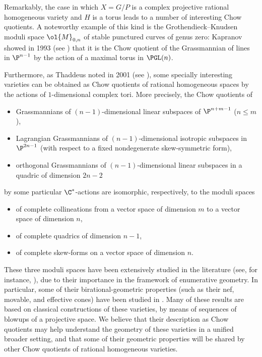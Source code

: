 \documentclass[11pt]{amsart}
\numberwithin{equation}{section}
\theoremstyle{definition}
\theoremstyle{remark}
\begin{document}
Remarkably, the case in which $X=G/P$ is a complex projective rational homogeneous variety and $H$ is a torus leads to a number of interesting Chow quotients. A noteworthy example of this kind is the Grothendieck--Knudsen moduli space $\ol{M}_{0,n}$ of stable punctured curves of genus zero: Kapranov showed in 1993 (see \cite[Chapter~4]{Kap}) that it is the Chow quotient of the Grassmannian of lines in $\P^{n-1}$ by the action of a maximal torus in $\PGL(n)$. 

Furthermore, as Thaddeus noted in 2001 (see \cite{Thaddeus}), some specially interesting varieties can be obtained as Chow quotients of  rational homogeneous spaces by the actions of $1$-dimensional complex tori. More precisely, the Chow quotients of
\begin{itemize}[leftmargin=25pt]
\item Grassmannians of $(n-1)$-dimensional linear subspaces of $\P^{n+m-1}$ ($n \le m$),
\item Lagrangian Grassmannians of $(n-1)$-dimensional isotropic subspaces in $\P^{2n-1}$ (with respect to a fixed nondegenerate skew-symmetric form),
\item orthogonal Grassmannians of $(n-1)$-dimensional linear subspaces in a quadric of dimension $2n-2$ 
\end{itemize}
by some particular $\C^*$-actions are isomorphic, respectively, to the moduli spaces
\begin{itemize}[leftmargin=25pt]
\item   of complete collineations from a vector space of dimension $m$ to a vector space of dimension $n$, 
\item of complete quadrics of dimension $n-1$,  
\item  of complete skew-forms on a vector space of dimension $n$. 
\end{itemize}

These three moduli spaces have been extensively studied in the literature (see, for instance, \cite{Lak82,Lak87,Lak88, Thaddeus, Vai82,Vai84}), due to their importance in the framework of enumerative geometry. In particular, some of their birational-geometric properties (such as their nef, movable, and effective cones) have been studied in \cite{Mas1,Mas2}. Many of these results are based on classical constructions of these varieties, by means of sequences of blowups of a projective space.  We believe that their description as Chow quotients may help understand the geometry of these varieties in a unified broader setting, and that some of their geometric properties will be shared by other Chow quotients of rational homogeneous varieties.
\end{document}
